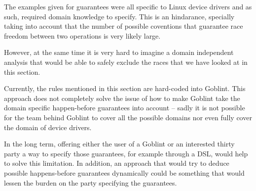 \documentclass[..thesis.tex]{subfiles}
\begin{document}

The examples given for guarantees were all specific to Linux device drivers and as such, required domain knowledge to specify. This is an hindarance,
specially taking into account that the number of possible coventions that guarantee race freedom between two operations is very likely large.  

However, at the same time it is very hard to imagine a domain independent analysis that would be able to safely exclude the races that we have looked at in this section.

Currently, the rules mentioned in this section are hard-coded into Goblint. This approach does not completely solve the issue of how to make Goblint take the domain specific happen-before
guarantees into account -- sadly it is not possible for the team behind Goblint to cover all the possible domains nor even fully cover the domain of device drivers.

In the long term, offering either the user of a Goblint or an interested thirty party a way to specify those guarantees,
for example through a DSL,  would help to solve this limitation. In addition, an approach that would try to deduce possible happens-before guarantees dynamically 
could be something that would lessen the burden on the party specifying the guarantees.

\end{document}
